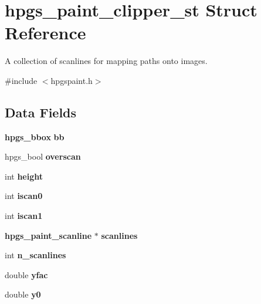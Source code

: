 \section{hpgs\_\-paint\_\-clipper\_\-st Struct Reference}
\label{structhpgs__paint__clipper__st}


A collection of scanlines for mapping paths onto images.  




{\ttfamily \#include $<$hpgspaint.h$>$}

\subsection*{Data Fields}
\begin{DoxyCompactItemize}
\item 
{\bf hpgs\_\-bbox} {\bfseries bb}\label{structhpgs__paint__clipper__st_a99e473a73883b3dc7f878011ccc78a29}

\item 
hpgs\_\-bool {\bf overscan}
\item 
int {\bf height}
\item 
int {\bf iscan0}
\item 
int {\bf iscan1}
\end{DoxyCompactItemize}
\begin{Indent}{\bf }\par
{\em \label{_amgrpd41d8cd98f00b204e9800998ecf8427e}
 }\begin{DoxyCompactItemize}
\item 
{\bf hpgs\_\-paint\_\-scanline} $\ast$ {\bf scanlines}
\item 
int {\bfseries n\_\-scanlines}\label{structhpgs__paint__clipper__st_a367b1a282fe5383aa5f263180c804fcc}

\end{DoxyCompactItemize}
\end{Indent}
\begin{Indent}{\bf }\par
{\em \label{_amgrpd41d8cd98f00b204e9800998ecf8427e}
 }\begin{DoxyCompactItemize}
\item 
double {\bf yfac}
\item 
double {\bfseries y0}\label{structhpgs__paint__clipper__st_a40c3cba1b7385c968894c9c22eb914cb}

\end{DoxyCompactItemize}
\end{Indent}


